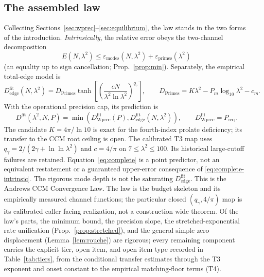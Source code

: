 \documentclass[11pt,a4paper]{article}
\begin{document}
\subsection{The assembled law}\label{ssec:assembled}

Collecting Sections~\ref{sec:wprec}--\ref{sec:equilibrium}, the law stands in the
two forms of the introduction. \emph{Intrinsically}, the relative error obeys
the two-channel decomposition
\begin{equation}\label{eq:complete-intrinsic}
  E(N,\lambda^2)\le\varepsilon_{\mathrm{modes}}(N,\lambda^2)
                +\varepsilon_{\mathrm{primes}}(\lambda^2)
\end{equation}
(an equality up to sign cancellation; Prop.~\ref{prop:min}). Separately,
the empirical total-edge model is
\[
 D_{\mathrm{edge}}^{\mathrm{fit}}(N,\lambda^2)
 =D_{\mathrm{Primes}}\tanh\!\left[
    \left(\frac{cN}{\lambda^2\ln\lambda^2}\right)^{q_\gamma}\right],
 \qquad D_{\mathrm{Primes}}=K\lambda^2-P_m\log_{10}\lambda^2-c_m.
\]
With the operational precision cap, its prediction is
\begin{equation}\label{eq:complete}
 D^{\mathrm{fit}}(\lambda^2,N,P)
 =\min\!\left(D_{\mathrm{Wprec}}^{\mathrm{fit}}(P),
                        D_{\mathrm{edge}}^{\mathrm{fit}}(N,\lambda^2)\right),
 \qquad D_{\mathrm{Wprec}}^{\mathrm{fit}}=P_{\mathrm{req}}.
\end{equation}
The candidate $K=4\pi/\ln10$ is exact for the fourth-index prolate
deficiency; its transfer to the CCM root ceiling is open. The calibrated
T3 map uses $q_\gamma=2/(2\gamma+\ln\ln\lambda^2)$ and $c=4/\pi$ on
$7\le\lambda^2\le100$. Its historical large-cutoff failures are retained.
Equation~\eqref{eq:complete} is a point predictor, not an equivalent
restatement or a guaranteed upper-error consequence of
\eqref{eq:complete-intrinsic}. The rigorous mode depth is not the
saturating $D_{\mathrm{edge}}^{\mathrm{fit}}$.
This is the Andrews CCM Convergence Law. The law is the budget skeleton and
its empirically measured channel functions; the particular closed
$(q_\gamma,4/\pi)$ map is its calibrated caller-facing realization, not a
construction-wide theorem. Of the law's parts, the minimum bound, the precision
slope, the stretched-exponential rate unification
(Prop.~\ref{prop:stretched}), and the general simple-zero displacement
(Lemma~\ref{lem:rouche}) are rigorous; every remaining component carries the
explicit tier, open item, and open-item type recorded in
Table~\ref{tab:tiers}, from the conditional transfer estimates through the T3
exponent and onset constant to the empirical matching-floor terms (T4).
\end{document}
